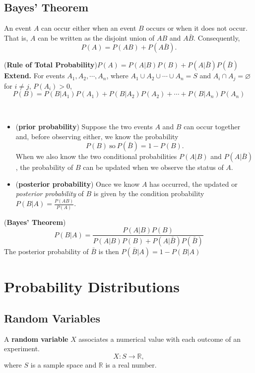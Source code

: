 \documentclass[12pt,a4paper]{article}
\newcommand{\dispsty}{\displaystyle}
\newcommand{\makedashline}{\hdashrule[0.5ex]{\linewidth}{0.5pt}{2mm}}
\begin{document}
\subsection{Bayes' Theorem}
An event $A$ can occur either when an event $B$ occurs or when it does not occur. That is, $A$ can be written as the disjoint union of $AB$ and $A\bar{B}$. Consequently, \[
P(A) = P(AB) + P(A\bar{B}).
\]
\begin{tcolorbox}[colback=white]
	(\textbf{Rule of Total Probability})\quad \(P(A)=P(A|B)P(B) + P(A|\bar{B})P(\bar{B}) \)
	\tcblower
	\textbf{Extend.} For events $A_1, A_2, \cdots, A_n$, where $A_1\cup A_2\cup\cdots\cup A_n=S$ and $A_i\cap A_j=\varnothing$ for $i\neq j$, $P(A_i)>0$, \[
	P(B) = P(B|A_1)P(A_1) + P(B|A_2)P(A_2) + \cdots + P(B|A_n)P(A_n)
	\]
\end{tcolorbox}\ \\
\makedashline
\begin{itemize}
	\item (\textbf{prior probability}) Suppose the two events $A$ and $B$ can occur together and, before observing either, we know the probability \[
	P(B)\ \text{so}\ P(\bar{B})=1-P(B).
	\] When we also know the two conditional probabilities $P(A|B)$ and $P(A|\bar{B})$, the probability of $B$ can be updated when we observe the status of $A$.
	\item (\textbf{posterior probability}) Once we know $A$ has occurred, the updated or \textit{posterior probability} of $B$ is given by the condition probability \(\dispsty P(B|A)=\frac{P(AB)}{P(A)} \).
\end{itemize}

\begin{tcolorbox}[colback=white]
	(\textbf{Bayes' Theorem}) \[
	P(B|A) = \frac{P(A|B)P(B)}{P(A|B)P(B)+P(A|\bar{B})P(\bar{B})}
	\] The posterior probability of $\bar{B}$ is then $P(\bar{B}|A)=1-P(B|A)$
\end{tcolorbox}

\section{Probability Distributions}

\subsection{Random Variables}

\begin{tcolorbox}[colback=white]
	A \textbf{random variable} $X$ associates a numerical value with each outcome of an experiment. \[
	X: S\to\mathbb{R},
	\] where $S$ is a sample space and $\mathbb{R}$ is a real number.
\end{tcolorbox}
\end{document}
